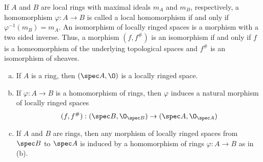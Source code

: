 If $A$ and $B$ are local rings with maximal ideals $m_A$ and $m_B$, respectively, a homomorphism $\varphi: A \to B$ is called a local homomorphism if and only if $\varphi^{-1}(m_B)= m_A$. An isomorphism of locally ringed spaces is a morphism with a two sided inverse. Thus, a morphism $(f,f^\#)$ is an isomorphism if and only if $f$ is a homeomorphism of the underlying topological spaces and $f^\#$ is an isomorphism of sheaves.


\begin{prop}
\begin{enumerate}[(a)]
\item If $A$ is a ring, then $(\spec A, \O)$ is a locally ringed space.
\item If $\varphi: A \to B$ is a homomorphism of rings, then $\varphi$ induces a natural morphism of locally ringed spaces
	\[
	(f,f^{\#}): (\spec B, \O_{\spec B}) \to (\spec A, \O_{\spec A})
	\]
\item If $A$ and $B$ are rings, then any morphism of locally ringed spaces from $\spec B$ to $\spec A$ is induced by a homomorphism of rings $\varphi: A \to B$ as in (b).
\end{enumerate}
\end{prop}

